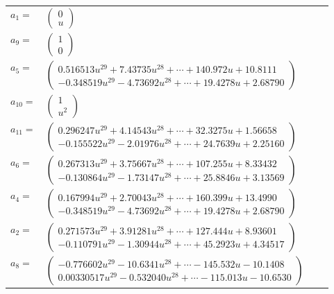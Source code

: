 \documentclass[1p]{elsarticle_modified}
\theoremstyle{definition}
\begin{document}
\begin{tabular}{m{7pt} m{180pt} m{7pt} m{180pt} }
\flushright $a_{1}=$&$\begin{pmatrix}0\\u\end{pmatrix}$ \\
\flushright $a_{9}=$&$\begin{pmatrix}1\\0\end{pmatrix}$ \\
\flushright $a_{5}=$&$\begin{pmatrix}0.516513 u^{29}+7.43735 u^{28}+\cdots+140.972 u+10.8111\\-0.348519 u^{29}-4.73692 u^{28}+\cdots+19.4278 u+2.68790\end{pmatrix}$ \\
\flushright $a_{10}=$&$\begin{pmatrix}1\\u^2\end{pmatrix}$ \\
\flushright $a_{11}=$&$\begin{pmatrix}0.296247 u^{29}+4.14543 u^{28}+\cdots+32.3275 u+1.56658\\-0.155522 u^{29}-2.01976 u^{28}+\cdots+24.7639 u+2.25160\end{pmatrix}$ \\
\flushright $a_{6}=$&$\begin{pmatrix}0.267313 u^{29}+3.75667 u^{28}+\cdots+107.255 u+8.33432\\-0.130864 u^{29}-1.73147 u^{28}+\cdots+25.8846 u+3.13569\end{pmatrix}$ \\
\flushright $a_{4}=$&$\begin{pmatrix}0.167994 u^{29}+2.70043 u^{28}+\cdots+160.399 u+13.4990\\-0.348519 u^{29}-4.73692 u^{28}+\cdots+19.4278 u+2.68790\end{pmatrix}$ \\
\flushright $a_{2}=$&$\begin{pmatrix}0.271573 u^{29}+3.91281 u^{28}+\cdots+127.444 u+8.93601\\-0.110791 u^{29}-1.30944 u^{28}+\cdots+45.2923 u+4.34517\end{pmatrix}$ \\
\flushright $a_{8}=$&$\begin{pmatrix}-0.776602 u^{29}-10.6341 u^{28}+\cdots-145.532 u-10.1408\\0.00330517 u^{29}-0.532040 u^{28}+\cdots-115.013 u-10.6530\end{pmatrix}$ \\

\end{tabular}
\end{document}
